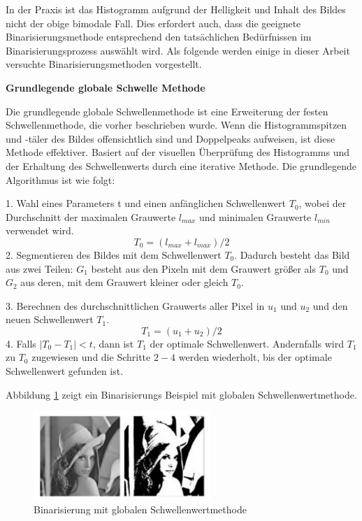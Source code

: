 In der Praxis ist das Histogramm aufgrund der Helligkeit und Inhalt des Bildes nicht der obige bimodale Fall. Dies erfordert auch, dass die geeignete Binarisierungsmethode entsprechend den tatsächlichen Bedürfnissen im Binarisierungsprozess auswählt wird. Als folgende werden einige in dieser Arbeit versuchte Binarisierungsmethoden vorgestellt.

\textbf{Grundlegende globale Schwelle Methode}

Die grundlegende globale Schwellenmethode ist eine Erweiterung der festen Schwellenmethode, die vorher beschrieben wurde. Wenn die Histogrammspitzen und -täler des Bildes offensichtlich sind und Doppelpeaks aufweisen, ist diese Methode effektiver. Basiert auf der visuellen Überprüfung des Histogramms und der Erhaltung des Schwellenwerts durch eine iterative Methode. Die grundlegende Algorithmus ist wie folgt:

1. Wahl eines Parameters t und einen anfänglichen Schwellenwert $ T_{0} $, wobei der Durchschnitt der maximalen Grauwerte $ l_{max} $ und minimalen Grauwerte  $ l_{min} $ verwendet wird. 
\begin{equation}
 T_{0} = (l_{max}+l_{max})/2 
\end{equation}
2. Segmentieren des Bildes mit dem Schwellenwert $ T_{0} $. Dadurch besteht das Bild aus zwei Teilen: $ G_{1} $ besteht aus den Pixeln mit dem Grauwert größer als $ T_{0} $ und $ G_{2} $ aus deren, mit dem Grauwert kleiner oder gleich $ T_{0} $.

3. Berechnen des durchschnittlichen Grauwerts aller Pixel in $ u_{1} $ und $ u_{2} $ und den neuen Schwellenwert $ T_{1} $.
\begin{equation}
 T_{1} = (u_{1}+u_{2})/2
\end{equation}
4. Falls $ |T_{0} - T_{1}| < t $, dann ist $ T_{1} $ der optimale Schwellenwert. Andernfalls wird $ T_{1} $ zu $ T_{0} $ zugewiesen und die Schritte $ 2-4 $ werden wiederholt, bis der optimale Schwellenwert gefunden ist.

Abbildung \ref{fig:Binarisierung mit globalen Schwellenwertmethode} zeigt ein Binarisierungs Beispiel mit globalen Schwellenwertmethode.

\begin{figure}[H]
 \centering 
  \includegraphics[keepaspectratio,width=0.6\textwidth]{images/4_ZweiteErfahrung/Binar/global.pdf}
 \caption{Binarisierung mit globalen Schwellenwertmethode}
 \label{fig:Binarisierung mit globalen Schwellenwertmethode}
\end{figure} 

